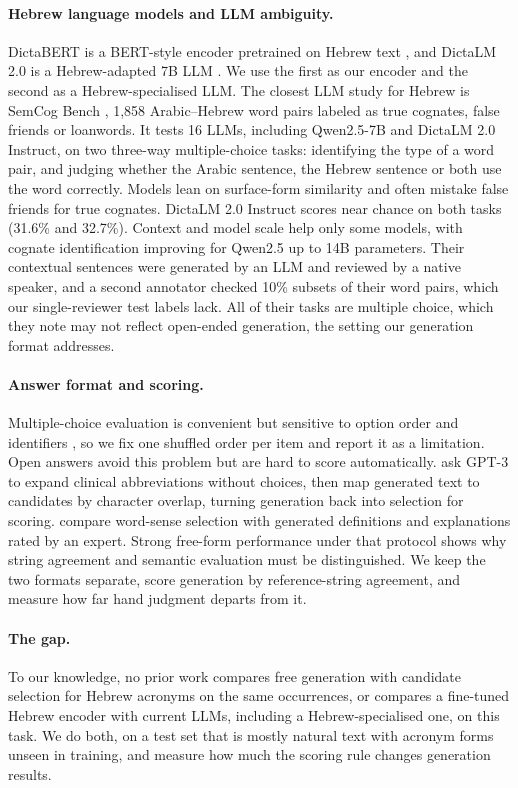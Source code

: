 \paragraph{Hebrew language models and LLM ambiguity.}
DictaBERT is a BERT-style encoder pretrained on Hebrew text \citep{shmidman2023dictabert}, and DictaLM 2.0 is a Hebrew-adapted 7B LLM \citep{shmidman2024dictalm}. We use the first as our encoder and the second as a Hebrew-specialised LLM. The closest LLM study for Hebrew is SemCog Bench \citep{liang2026cognates}, 1,858 Arabic--Hebrew word pairs labeled as true cognates, false friends or loanwords. It tests 16 LLMs, including Qwen2.5-7B and DictaLM 2.0 Instruct, on two three-way multiple-choice tasks: identifying the type of a word pair, and judging whether the Arabic sentence, the Hebrew sentence or both use the word correctly. Models lean on surface-form similarity and often mistake false friends for true cognates. DictaLM 2.0 Instruct scores near chance on both tasks (31.6\% and 32.7\%). Context and model scale help only some models, with cognate identification improving for Qwen2.5 up to 14B parameters. Their contextual sentences were generated by an LLM and reviewed by a native speaker, and a second annotator checked 10\% subsets of their word pairs, which our single-reviewer test labels lack. All of their tasks are multiple choice, which they note may not reflect open-ended generation, the setting our generation format addresses.

\paragraph{Answer format and scoring.}
Multiple-choice evaluation is convenient but sensitive to option order and identifiers \citep{zheng2024selection}, so we fix one shuffled order per item and report it as a limitation. Open answers avoid this problem but are hard to score automatically. \citet{agrawal2022large} ask GPT-3 to expand clinical abbreviations without choices, then map generated text to candidates by character overlap, turning generation back into selection for scoring. \citet{meconi2025large} compare word-sense selection with generated definitions and explanations rated by an expert. Strong free-form performance under that protocol shows why string agreement and semantic evaluation must be distinguished. We keep the two formats separate, score generation by reference-string agreement, and measure how far hand judgment departs from it.

\paragraph{The gap.}
To our knowledge, no prior work compares free generation with candidate selection for Hebrew acronyms on the same occurrences, or compares a fine-tuned Hebrew encoder with current LLMs, including a Hebrew-specialised one, on this task. We do both, on a test set that is mostly natural text with acronym forms unseen in training, and measure how much the scoring rule changes generation results.

